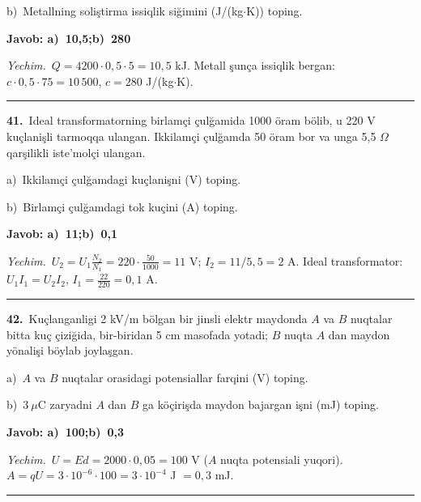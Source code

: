 \documentclass[11pt,a4paper]{article}
\begin{document}
\noindent\hspace*{4mm}b)\ Metallning soliştirma issiqlik siğimini (J/(kg$\cdot$K)) toping.\par
\noindent\colorbox{gray!12}{\parbox{\dimexpr\linewidth-2\fboxsep}{\textbf{Javob: a)\ 10,5;\quad b)\ 280}}}\par\smallskip
\noindent\textit{Yechim.}\ $Q=4200\cdot0{,}5\cdot5=10{,}5$ kJ. Metall şunça issiqlik bergan: $c\cdot0{,}5\cdot75=10\,500$, $c=280$ J/(kg$\cdot$K).\par\par\medskip\hrule\medskip
{}\noindent\textbf{41.}\ Ideal transformatorning birlamçi çulğamida 1000 öram bölib, u 220 V kuçlanişli tarmoqqa ulangan. Ikkilamçi çulğamda 50 öram bor va unga 5,5 $\Omega$ qarşilikli iste’molçi ulangan.\par
\noindent\hspace*{4mm}a)\ Ikkilamçi çulğamdagi kuçlanişni (V) toping.\par
\noindent\hspace*{4mm}b)\ Birlamçi çulğamdagi tok kuçini (A) toping.\par
\noindent\colorbox{gray!12}{\parbox{\dimexpr\linewidth-2\fboxsep}{\textbf{Javob: a)\ 11;\quad b)\ 0,1}}}\par\smallskip
\noindent\textit{Yechim.}\ $U_2=U_1\frac{N_2}{N_1}=220\cdot\frac{50}{1000}=11$ V; $I_2=11/5{,}5=2$ A. Ideal transformator: $U_1I_1=U_2I_2$, $I_1=\frac{22}{220}=0{,}1$ A.\par\par\medskip\hrule\medskip
{}\noindent\textbf{42.}\ Kuçlanganligi 2 kV/m bölgan bir jinsli elektr maydonda $A$ va $B$ nuqtalar bitta kuç çiziğida, bir-biridan 5 cm masofada yotadi; $B$ nuqta $A$ dan maydon yönalişi böylab joylaşgan.\par
\noindent\hspace*{4mm}a)\ $A$ va $B$ nuqtalar orasidagi potensiallar farqini (V) toping.\par
\noindent\hspace*{4mm}b)\ $3\ \mu$C zaryadni $A$ dan $B$ ga köçirişda maydon bajargan işni (mJ) toping.\par
\noindent\colorbox{gray!12}{\parbox{\dimexpr\linewidth-2\fboxsep}{\textbf{Javob: a)\ 100;\quad b)\ 0,3}}}\par\smallskip
\noindent\textit{Yechim.}\ $U=Ed=2000\cdot0{,}05=100$ V ($A$ nuqta potensiali yuqori). $A=qU=3\cdot10^{-6}\cdot100=3\cdot10^{-4}$ J $=0{,}3$ mJ.\par\par\medskip\hrule\medskip
\end{document}

